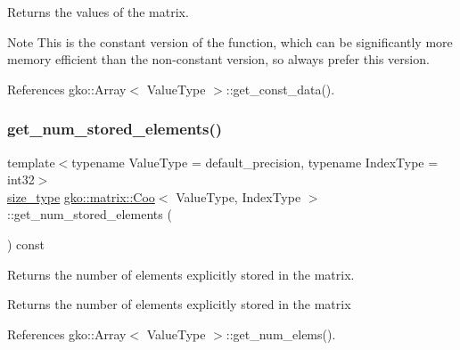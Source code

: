 \begin{DoxyReturn}{Returns}
the values of the matrix.
\end{DoxyReturn}
\begin{DoxyNote}{Note}
This is the constant version of the function, which can be significantly more memory efficient than the non-\/constant version, so always prefer this version. 
\end{DoxyNote}


References gko\+::\+Array$<$ Value\+Type $>$\+::get\+\_\+const\+\_\+data().

\mbox{\label{classgko_1_1matrix_1_1Coo_aece531e069f8490fd8d2b3ab58f72d09}} 
\subsubsection{\texorpdfstring{get\+\_\+num\+\_\+stored\+\_\+elements()}{get\_num\_stored\_elements()}}
{\footnotesize\ttfamily template$<$typename Value\+Type = default\+\_\+precision, typename Index\+Type = int32$>$ \\
\hyperlink{namespacegko_a6e5c95df0ae4e47aab2f604a22d98ee7}{size\+\_\+type} \hyperlink{classgko_1_1matrix_1_1Coo}{gko\+::matrix\+::\+Coo}$<$ Value\+Type, Index\+Type $>$\+::get\+\_\+num\+\_\+stored\+\_\+elements (\begin{DoxyParamCaption}{ }\end{DoxyParamCaption}) const\hspace{0.3cm}{\ttfamily [noexcept]}}



Returns the number of elements explicitly stored in the matrix. 

\begin{DoxyReturn}{Returns}
the number of elements explicitly stored in the matrix 
\end{DoxyReturn}


References gko\+::\+Array$<$ Value\+Type $>$\+::get\+\_\+num\+\_\+elems().

\mbox{\label{classgko_1_1matrix_1_1Coo_a57aa0f7b701020c4322a3aed63d8a25d}} 
